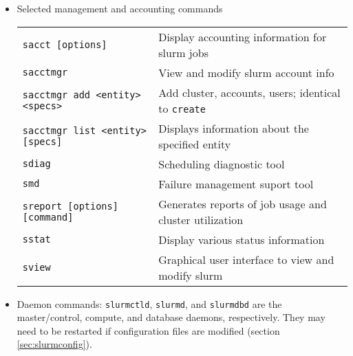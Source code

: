 \begin{itemize}
  \item Selected management and accounting commands \\
    \begin{tabular}{l p{3.4in}}
      \texttt{sacct [options]} & Display accounting information for slurm jobs \\
      \texttt{sacctmgr}                      & View and modify slurm account info \\
      \texttt{sacctmgr add <entity> <specs>} & Add cluster, accounts, users; identical to \texttt{create} \\
      \texttt{sacctmgr list <entity> [specs]} & Displays information about the specified entity\\
      \texttt{sdiag}                         & Scheduling diagnostic tool \\
      \texttt{smd}                           & Failure management suport tool \\
      \texttt{sreport [options] [command]}   & Generates reports of job usage and cluster utilization \\
      \texttt{sstat}                         & Display various status information \\
      \texttt{sview}                         & Graphical user interface to view and modify slurm \\
    \end{tabular}


  \item Daemon commands: \texttt{slurmctld}, \texttt{slurmd}, and \texttt{slurmdbd} are the master/control, compute, and database daemons, respectively. They may need to be restarted if configuration files are modified (section \ref{sec:slurmconfig}). \\


\end{itemize}
